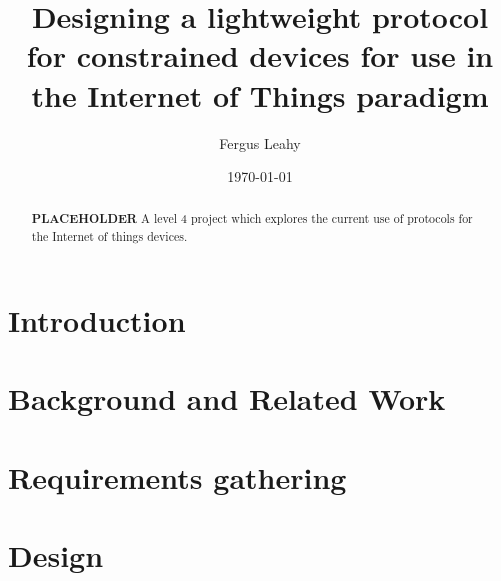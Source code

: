 \documentclass{l4proj}
\begin{document}
\title{Designing a lightweight protocol for constrained devices for use in the Internet of Things paradigm}
\author{Fergus Leahy}
\date{\today}
\maketitle

\begin{abstract}
\textbf{PLACEHOLDER}
A level 4 project which explores the current use of protocols for the Internet of things devices.
\end{abstract}

\educationalconsent
%
%
\tableofcontents

\chapter{Introduction}

\chapter{Background and Related Work} %
\label{cha:background}




\chapter{Requirements gathering} %
\label{cha:requirments_gathering}






\chapter{Design} %
\label{cha:design}

\end{document}
